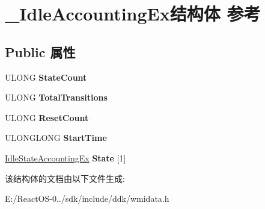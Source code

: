 \hypertarget{struct___idle_accounting_ex}{}\section{\+\_\+\+Idle\+Accounting\+Ex结构体 参考}
\label{struct___idle_accounting_ex}
\subsection*{Public 属性}
\begin{DoxyCompactItemize}
\item 
\mbox{\label{struct___idle_accounting_ex_ab5e8909459621a651d3af9c4c8fea406}} 
U\+L\+O\+NG {\bfseries State\+Count}
\item 
\mbox{\label{struct___idle_accounting_ex_aa9f3fab7ed0b6fadf9de04489379e62d}} 
U\+L\+O\+NG {\bfseries Total\+Transitions}
\item 
\mbox{\label{struct___idle_accounting_ex_a37acc8f643def4711b00c756bebc127f}} 
U\+L\+O\+NG {\bfseries Reset\+Count}
\item 
\mbox{\label{struct___idle_accounting_ex_a528237c79f3c6fb8d4a732f64be58d0e}} 
U\+L\+O\+N\+G\+L\+O\+NG {\bfseries Start\+Time}
\item 
\mbox{\label{struct___idle_accounting_ex_a352a71efdc022471fbbe8f2caf196589}} 
\hyperlink{struct___idle_state_accounting_ex}{Idle\+State\+Accounting\+Ex} {\bfseries State} \mbox{[}1\mbox{]}
\end{DoxyCompactItemize}


该结构体的文档由以下文件生成\+:\begin{DoxyCompactItemize}
\item 
E\+:/\+React\+O\+S-\/0../sdk/include/ddk/wmidata.\+h\end{DoxyCompactItemize}
